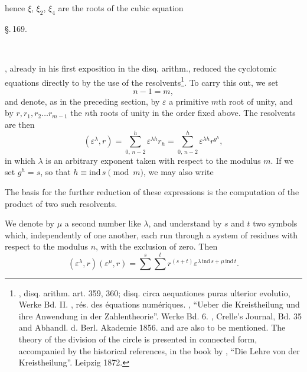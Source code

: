 hence $\xi$, $\xi_2$, $\xi_4$ are the roots of the cubic equation

\begin{center}
\S.\,169.

\\
\end{center}

, already in his first exposition in the disq.
arithm., reduced the cyclotomic equations directly to 
by the use of the resolvents\footnote{, disq. arithm. art. 359, 360; disq. circa aequationes puras ulterior evolutio, Werke Bd. II. , r\'es. des \'equations num\'eriques. , ``Ueber die Kreistheilung und ihre Anwendung in der Zahlentheorie''. Werke Bd. 6. , Crelle's Journal, Bd. 35 and Abhandl. d. Berl. Akademie 1856.  and  are also to be mentioned. The theory of the division of the circle is presented in connected form, accompanied by the historical references, in the book by , ``Die Lehre von der Kreistheilung''. Leipzig 1872.}. To
carry this out, we set
\[ n - 1 = m, \]
and denote, as in the preceding section, by $\varepsilon$ a primitive
$m$th root of unity, and by $r, r_1, r_2 \ldots r_{m-1}$ the $n$th roots of unity
 in the order fixed above. The 
resolvents are then
\[ (\varepsilon^\lambda, r) = \sum_{0,\,n-2}^{h} \varepsilon^{\lambda h} r_h = \sum_{0,\,n-2}^{h} \varepsilon^{\lambda h} r^{g^h}, \]
in which $\lambda$ is an arbitrary exponent taken with respect to the modulus $m$.
If we set $g^h = s$, so that $h \equiv \mathrm{ind}\,s \pmod{m}$, we may
also write

The basis for the further reduction of these expressions
is the computation of the product of two such resolvents.

We denote by $\mu$ a second number like $\lambda$, and understand
by $s$ and $t$ two symbols which, independently of one another, each
run through a system of residues with respect to the modulus $n$, with the exclusion
of zero.
Then
\[ (\varepsilon^\lambda, r)(\varepsilon^\mu, r) = \sum^{s} \sum^{t} r^{(s+t)} \varepsilon^{\lambda\,\mathrm{ind}\,s + \mu\,\mathrm{ind}\,t}. \]
